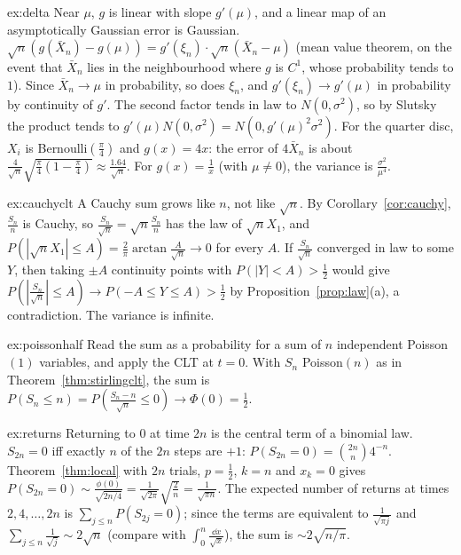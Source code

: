 \begin{solution}{ex:delta}
\idea Near $\mu$, $g$ is linear with slope $g'(\mu)$, and a linear map of an asymptotically Gaussian error is Gaussian.
\writeup $\sqrt n(g(\bar X_n)-g(\mu))=g'(\xi_n)\cdot\sqrt n(\bar X_n-\mu)$ (mean value theorem, on the event that $\bar X_n$ lies in the neighbourhood where $g$ is
$C^1$, whose probability tends to $1$). Since $\bar X_n\to\mu$ in probability, so does $\xi_n$, and $g'(\xi_n)\to g'(\mu)$ in probability by continuity of $g'$. The
second factor tends in law to $N(0,\sigma^2)$, so by Slutsky the product tends to $g'(\mu)N(0,\sigma^2)=N(0,g'(\mu)^2\sigma^2)$. For the quarter disc, $X_i$ is
Bernoulli$(\frac\pi4)$ and $g(x)=4x$: the error of $4\bar X_n$ is about $\frac4{\sqrt n}\sqrt{\frac\pi4(1-\frac\pi4)}\approx\frac{1.64}{\sqrt n}$. For $g(x)=\frac1x$ (with $\mu\ne0$), the variance is
$\frac{\sigma^2}{\mu^4}$.
\end{solution}

\begin{solution}{ex:cauchyclt}
\idea A Cauchy sum grows like $n$, not like $\sqrt n$.
\writeup By Corollary~\ref{cor:cauchy}, $\frac{S_n}n$ is Cauchy, so $\frac{S_n}{\sqrt n}=\sqrt n\frac{S_n}n$ has the law of $\sqrt nX_1$, and
$P(|\sqrt nX_1|\le A)=\frac2\pi\arctan\frac A{\sqrt n}\to0$ for every $A$. If $\frac{S_n}{\sqrt n}$ converged in law to some $Y$, then taking $\pm A$ continuity points with
$P(|Y|<A)>\frac12$ would give $P(|\frac{S_n}{\sqrt n}|\le A)\to P(-A\le Y\le A)>\frac12$ by Proposition~\ref{prop:law}(a), a contradiction. The variance is infinite.
\end{solution}

\begin{solution}{ex:poissonhalf}
\idea Read the sum as a probability for a sum of $n$ independent Poisson$(1)$ variables, and apply the CLT at $t=0$.
\writeup With $S_n$ Poisson$(n)$ as in Theorem~\ref{thm:stirlingclt}, the sum is $P(S_n\le n)=P(\frac{S_n-n}{\sqrt n}\le0)\to\Phi(0)=\frac12$.
\end{solution}

\begin{solution}{ex:returns}
\idea Returning to $0$ at time $2n$ is the central term of a binomial law.
\writeup $S_{2n}=0$ iff exactly $n$ of the $2n$ steps are $+1$: $P(S_{2n}=0)=\binom{2n}n4^{-n}$. Theorem~\ref{thm:local} with $2n$ trials, $p=\frac12$, $k=n$ and $x_k=0$ gives
$P(S_{2n}=0)\sim\frac{\phi(0)}{\sqrt{2n/4}}=\frac1{\sqrt{2\pi}}\sqrt{\frac2n}=\frac1{\sqrt{\pi n}}$. The expected number of returns at times $2,4,\dots,2n$ is
$\sum_{j\le n}P(S_{2j}=0)$; since the terms are equivalent to $\frac1{\sqrt{\pi j}}$ and $\sum_{j\le n}\frac1{\sqrt j}\sim2\sqrt n$ (compare with $\int_0^n\frac{\dd x}{\sqrt x}$), the
sum is $\sim2\sqrt{n/\pi}$.
\end{solution}

